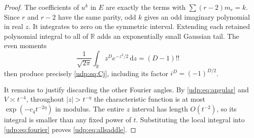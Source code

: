 \documentclass[11pt]{article}
\theoremstyle{remark}\newtheorem{remark}[theorem]{Remark}
\newcommand{\dd}{\,\mathrm d}
\newcommand{\R}{\mathbb R}
\numberwithin{equation}{section}
\begin{document}
\begin{proof}
The coefficients of $u^k$ in $E$ are exactly the terms with $\sum(r-2)m_r=k$. Since $r$ and $r-2$ have the same parity, odd $k$ gives an odd imaginary polynomial in real $z$. It integrates to zero on the symmetric interval. Extending each retained polynomial integral to all of $\R$ adds an exponentially small Gaussian tail. The even moments
\[
 \frac1{\sqrt{2\pi}}\int_\R z^De^{-z^2/2}\dd z=(D-1)!!
\]
then produce precisely \eqref{udp:eq:Cj}, including its factor $i^D=(-1)^{D/2}$.

It remains to justify discarding the other Fourier angles. By \eqref{udp:eq:angular} and $V\asymp t^{-4}$, throughout $|z|>t^{-\eta}$ the characteristic function is at most $\exp(-c_4t^{-2\eta})$ in modulus. The entire $z$ interval has length $O(t^{-2})$, so its integral is smaller than any fixed power of $t$. Substituting the local integral into \eqref{udp:eq:fourier} proves \eqref{udp:eq:allsaddle}.
\end{proof}
\end{document}
